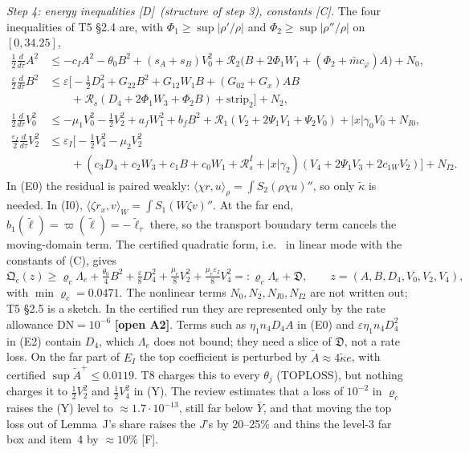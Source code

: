 \documentclass[11pt]{article}
\theoremstyle{definition}
\theoremstyle{remark}
\newcommand{\fn}[1]{\texttt{\detokenize{#1}}}
\newcommand{\tC}{\textnormal{\textsc{[C]}}}
\newcommand{\tD}{\textnormal{\textsc{[D]}}}
\newcommand{\tF}{\textnormal{\textsc{[F]}}}
\newcommand{\OPEN}[1]{\textcolor{red!75!black}{\textbf{\textsf{[open #1]}}}}
\newcommand{\ip}[2]{\langle #1,#2\rangle}
\newcommand{\abs}[1]{\lvert #1\rvert}
\newcommand{\kt}{\tilde\kappa}
\newcommand{\lt}{\tilde\ell}
\newcommand{\Yb}{\bar Y}
\newcommand{\eps}{\varepsilon}
\newcommand{\cR}{\mathcal R}
\newcommand{\Lam}{\Lambda}
\begin{document}
\emph{Step 4: energy inequalities \tD\ (structure of step 3), constants \tC.} The four inequalities of T5 \S2.4 are, with $\Phi_1\ge\sup\abs{\rho'/\rho}$ and $\Phi_2\ge\sup\abs{\rho''/\rho}$ on $[0,34.25]$,
\begin{align*}
\tfrac12\tfrac d{d\tau}A^2&\le-c_IA^2-\theta_0B^2+(s_A+s_B)V_0^2+\cR_2\bigl(B+2\Phi_1W_1+(\Phi_2+\bar mc_\varphi)A\bigr)+N_0,\tag{E0}\\
\tfrac\eps2\tfrac d{d\tau}B^2&\le\eps\bigl[-\tfrac12D_4^2+G_{22}B^2+G_{12}W_1B+(G_{02}+G_x)AB\\&\qquad+\cR_s(D_4+2\Phi_1W_3+\Phi_2B)+\text{strip}_2\bigr]+N_2,\tag{E2}\\
\tfrac12\tfrac d{d\tau}V_0^2&\le-\mu_1V_0^2-\tfrac12V_2^2+a_fW_1^2+b_fB^2+\cR_1(V_2+2\Psi_1V_1+\Psi_2V_0)+\abs x\gamma_0V_0+N_{I0},\tag{I0}\\
\tfrac{\eps_I}2\tfrac d{d\tau}V_2^2&\le\eps_I\bigl[-\tfrac12V_4^2-\mu_2V_2^2\\&\qquad+(c_3D_4+c_2W_3+c_1B+c_0W_1+\cR^I_s+\abs x\gamma_2)(V_4+2\Psi_1V_3+2c_{1W}V_2)\bigr]+N_{I2}.\tag{I2}
\end{align*}
In (E0) the residual is paired weakly: $\ip{\chi r}u_\rho=\int S_2(\rho\chi u)''$, so only $\kt$ is needed. In (I0), $\ip{\zeta r_x}v_W=\int S_1(W\zeta v)''$. At the far end, $b_1(\lt)=\varpi(\lt)=-\lt_\tau$ there, so the transport boundary term cancels the moving-domain term. The certified quadratic form, i.e.\ \fn{closure_cert.py} in linear mode with the constants of (C), gives
\[
\mathfrak Q_c(z)\ge\varrho_c\Lam_e+\tfrac{\theta_0}4B^2+\tfrac\eps8D_4^2+\tfrac{\mu_e}8V_2^2+\tfrac{\mu_e\eps_I}8V_4^2=:\varrho_c\Lam_e+\mathfrak D,\qquad z=(A,B,D_4,V_0,V_2,V_4),
\]
with $\min\varrho_c=0.0471$. The nonlinear terms $N_0,N_2,N_{I0},N_{I2}$ are not written out; T5 \S2.5 is a sketch. In the certified run they are represented only by the rate allowance $\mathrm{DN}=10^{-6}$ \OPEN{A2}. Terms such as $\eta_1n_4D_4A$ in (E0) and $\eps\eta_1n_4D_4^2$ in (E2) contain $D_4$, which $\Lam_e$ does not bound; they need a slice of $\mathfrak D$, not a rate loss. On the far part of $E_I$ the top coefficient is perturbed by $\tilde A\approx4\kt e$, with certified $\sup\tilde A^+\le0.0119$. T8 charges this to every $\theta_j$ (TOPLOSS), but nothing charges it to $\frac12V_2^2$ and $\frac12V_4^2$ in (Y). The review estimates that a loss of $10^{-2}$ in $\varrho_c$ raises the (Y) level to $\approx1.7\cdot10^{-13}$, still far below $\Yb$, and that moving the top loss out of Lemma~J's share raises the $J$'s by 20--25\% and thins the level-3 far box and item~4 by $\approx10\%$ \tF.
\end{document}
